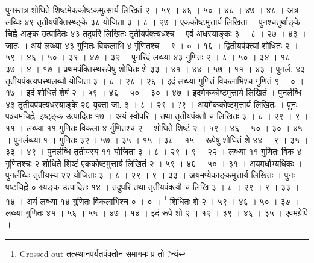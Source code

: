 \documentclass[11pt,a5paper]{book}
\begin{document}
{पुनस्तत्र शोधिते शिष्टमेककोष्टकमुत्सार्य लिखितं २ । ५९ । ४६ । ५० । ४८ । ४७ । ४८ । अत्र लब्धिः ४९ तृतीयपंक्तिस्थ्ङ्के ३८ योजिता ३ । ८ । २७ । एककोष्टमुत्तार्य लिखिता । पुनश्चतुर्थाङ्के चिह्ने अङ्क उत्पादितः ४३ तदुपरि लिखितः तृतीयपंक्त्यधश्च । एवं अधस्याङ्कः ३ । ८ । २७ । ४३ । जातः । अयं लब्ध्या ४३ गुणितः विकलाभि ४ र्गुणितश्च । ९ । ० । १६ । द्वितीयपंक्त्यां शोधितः २ । ५९ । ४६ । ५० । ३९ । ४७ । ३२ । पुनरिदं लब्ध्या ४३ गुणितः २ । ८ । ५० । ३४ । १८ । ३७ । ४ । १७ । प्रथमपंक्तिस्थरूपेषु शोधितः शे ३३ । ४१ । ४४ । ५७ । ११ । ४३ । पुनर्ल. ४३ तृतीयपंक्त्यधस्थलब्धौ योजिता ३ । ८ । २८ । २६ । इदं लब्ध्यां गुणितं विकलाभिश्च  गुणितं ९ । ० । १७ । इदं शोधितं शेषं २ । ५९ । ४६ । ५० । ३० । ४७ । इदमेककोष्टमुत्तार्य लिखितं । पुनर्लब्धि ४३ तृतीयपंक्त्यधस्याङ्के २६ युक्ता जा. ३ । ८ । २९ । ?९ । अयमेककोष्टमुत्तार्य लिखितः । पुनः पञ्चमचिह्ने. इष्ट्ङ्क उत्पादितः १७ । अयं स्वोपरि । तथा तृतीयपंक्तौ च लिखितः ३ । ८ । २९ । ९ । ११ । लब्ध्या ११ गुणितः विकला ४ र्गुणितश्च २ । शोधिते शिष्टं २ । ५९ । ४६ । ५० । ३० । ४५ । पुनर्लब्ध्या १ । गुणितः ३२ । ५७ । ३५ । १५ । ३८ । १५ । रूपेषु शोधितं शे ४४ । ९ । ३५ । ३३ । ४९ । पुनर्लब्धि तृतीयस्य ११ योजिता ३ । ८ । २९ । ९ । २२ । लब्ध्या ११ गुणितः विक ४ गुणितश्चः २ शोधिते शिष्टं एककोष्टमुत्तार्य लिखितं २ । ५९ । ४६ । ५० । ३१ । अयमर्धाभ्यधिकः । पुनर्लब्धिः तृतीयस्य २२ योजिताः ३ । ८ । २९ । ९ । ३३ । अयमप्येकाङ्कमुत्तार्य लिखितः । पुनः षष्टचिह्ने ० श्व्यङ्क उत्पादितः १४ । तदुपरि तथा तृतीयपंक्त्यौ च लिखि ३ । ८ । २९ । ९ । ३३ । १४ । अयं लब्ध्या १४ गुणितः विकलाभिश्च ० । ० । \footnote{Crossed out तत्स्थानपर्यतपंक्तोन समागमः प्र तो ?न्यं} शिधितः शे २ । ५९ । ४६ । ५० । ३७ । लब्ध्या गुणितः ४१ । ५६ । ५५ । ४७ । १४ । इदं रूपे शो २ । १२ । ३९ । ४६ । ३५ । एवमग्रेपि ।}   
\end{document}
